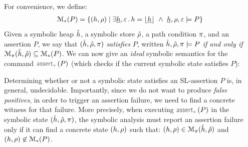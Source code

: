 %
For convenience, we define: 
{\small 
\begin{align}
\mathcal{M}_{*}(P) = \left\{ (h, \rho) \mid \exists \underline{h}, \varepsilon \, . \,  h = \lfloor \underline{h} \rfloor \ \wedge \ \underline{h}, \rho, \varepsilon \models P  \right\}
\end{align}}
\hspace{-2pt}Given a symbolic heap $\hat{h}$, a symbolic store $\hat\rho$, a path condition $\pi$, and 
an assertion $P$, we say that  $(\hat{h}, \hat\rho, \pi)$ \emph{satisfies} $P$, 
written $\hat{h}, \hat\rho, \pi \models P$ \emph{if and only if}
$\mathcal{M}_{\pi}(\hat{h}, \hat\rho) \subseteq \mathcal{M}_{*}(P)$. 
%
We can now give an \emph{ideal} symbolic semantics for the command $\sepassert(P)$ (which checks
if the current symbolic state satisfies $P$): 
{\small {}}
\hspace{-3pt}Determining whether or not a symbolic state satisfies an SL-assertion $P$ is, in general, 
undecidable. Importantly, since we do not want to produce \emph{false positives}, in order to trigger 
an assertion failure, we need to find a concrete witness for that failure. More precisely, when executing 
$\sepassert(P)$ in the symbolic state $(\hat{h}, \hat\rho, \pi)$, the symbolic analysis must  
report an assertion failure only if it can find a concrete state $(h, \rho)$ such that: 
$(h, \rho) \in \mathcal{M}_{\pi}(\hat{h}, \hat\rho)$ and
$(h, \rho) \not\in \mathcal{M}_{*}(P)$.

